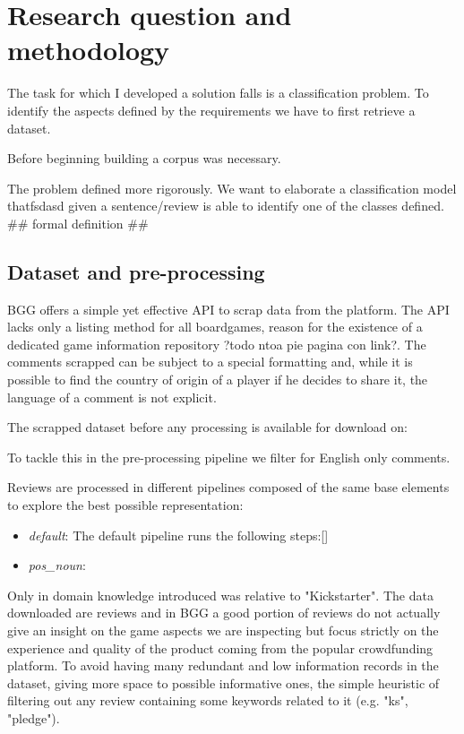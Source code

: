 \section{Research question and methodology}

The task for which I developed a solution falls is a classification problem.
To identify the aspects defined by the requirements we have to first retrieve a dataset.

Before beginning building a corpus was necessary.


The problem defined more rigorously.
We want to elaborate a classification model thatfsdasd given a sentence/review is able to identify one of the classes defined.
## formal definition ##

\subsection{Dataset and pre-processing}
BGG offers a simple yet effective API to scrap data from the platform. The API lacks only a listing method
for all boardgames, reason for the existence of a dedicated game information repository ?todo ntoa pie pagina con link?.
The comments scrapped can be subject to a special formatting and, while it is possible to find the country of origin
of a player if he decides to share it, the language of a comment is not explicit.

The scrapped dataset before any processing is available for download on: %

To tackle this in the pre-processing pipeline we filter for English only comments.

Reviews are processed in different pipelines composed of the same base elements to explore the best possible representation:
\begin{itemize}
    \item {\textit{default}}: The default pipeline runs the following steps:[]
    \item {\textit{pos_noun}}:
\end{itemize}

Only in domain knowledge introduced was relative to "Kickstarter". The data downloaded are reviews and in BGG a good portion
of reviews do not actually give an insight on the game aspects we are inspecting but focus strictly on the experience
and quality of the product coming from the popular crowdfunding platform.
To avoid having many redundant and low information records in the dataset, giving more space to possible informative ones,
the simple heuristic of filtering out any review containing some keywords related to it (e.g. "ks", "pledge").

